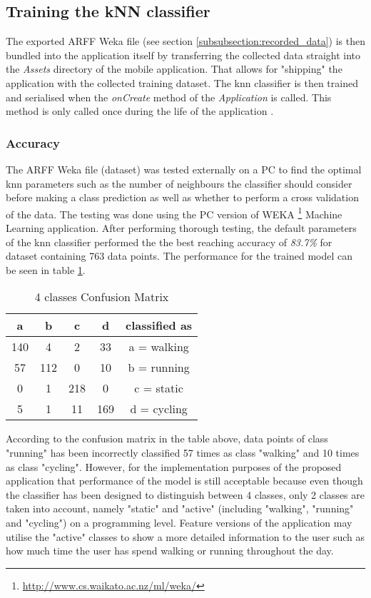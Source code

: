     \subsection{Training the kNN classifier}
    The exported ARFF Weka file (see section \ref{subsubsection:recorded_data}) is then bundled into the application itself by transferring the collected data straight into the \textit{Assets} directory of the mobile application. That allows for "shipping" the application with the collected training dataset. The \gls{knn} classifier is then trained and serialised when the \textit{onCreate} method of the \textit{Application} is called. This method is only called once during the life of the application \citep{googleapplication2017}.
    
    \subsubsection*{Accuracy}
    The ARFF Weka file (dataset) was tested externally on a PC to find the optimal \gls{knn} parameters such as the number of neighbours the classifier should consider before making a class prediction as well as whether to perform a cross validation of the data. The testing was done using the PC version of WEKA \footnote{\url{http://www.cs.waikato.ac.nz/ml/weka/}} Machine Learning application. After performing thorough testing, the default parameters of the \gls{knn} classifier performed the the best reaching accuracy of \textit{83.7\%} for dataset containing 763 data points. The performance for the trained model can be seen in table \ref{table:4_class_confusion_matrix}. 

    \begin{table}[ht]
    \centering
    \begin{tabular}{ |c|c|c|c||c| } 
     \hline
     a & b & c & d & classified as\\
     \hline \hline
     140 & 4 & 2 & 33 & a = walking \\
     57 & 112& 0 & 10 & b = running \\
     0 & 1 & 218 & 0 & c = static \\
     5 & 1 & 11 & 169 & d = cycling \\
     \hline
    \end{tabular}
    \caption{4 classes Confusion Matrix}
    \label{table:4_class_confusion_matrix}
    \end{table}

According to the confusion matrix in the table above, data points of class "running" has been incorrectly classified 57 times as class "walking" and 10 times as class "cycling". However, for the implementation purposes of the proposed application that performance of the model is still acceptable because even though the classifier has been designed to distinguish between 4 classes, only 2 classes are taken into account, namely "static" and "active" (including "walking", "running" and "cycling") on a programming level. Feature versions of the application may utilise the "active" classes to show a more detailed information to the user such as how much time the user has spend walking or running throughout the day.

